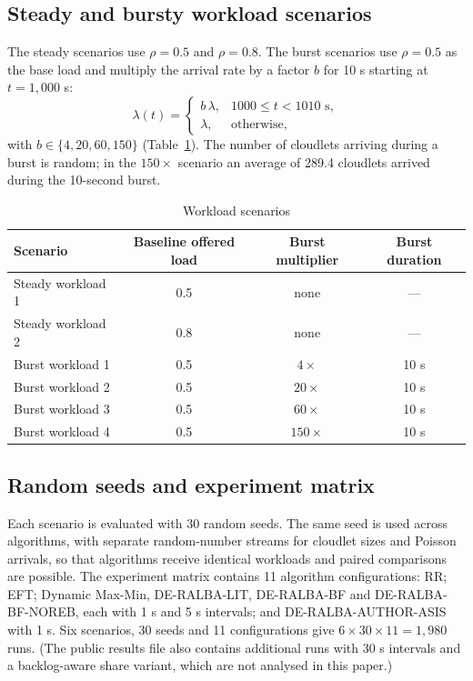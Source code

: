 \documentclass[default,sn-mathphys,Numbered]{sn-jnl}
\begin{document}
\subsection{Steady and bursty workload scenarios}
The steady scenarios use $\rho = 0.5$ and $\rho = 0.8$. The burst scenarios use $\rho = 0.5$ as the base load and multiply the arrival rate by a factor $b$ for 10 s starting at $t = 1{,}000$ s:
\begin{equation}\label{eq:burst}
\lambda(t) = \begin{cases} b\,\lambda, & 1000 \le t < 1010 \text{ s},\\ \lambda, & \text{otherwise}, \end{cases}
\end{equation}
with $b \in \{4, 20, 60, 150\}$ (Table~\ref{tab:scen}). The number of cloudlets arriving during a burst is random; in the $150\times$ scenario an average of 289.4 cloudlets arrived during the 10-second burst.

\begin{table}[h]
\caption{Workload scenarios}\label{tab:scen}
\centering
\begin{tabular}{lccc}
\toprule
Scenario & Baseline offered load & Burst multiplier & Burst duration \\
\midrule
Steady workload 1 & 0.5 & none & --- \\
Steady workload 2 & 0.8 & none & --- \\
Burst workload 1 & 0.5 & $4\times$ & 10 s \\
Burst workload 2 & 0.5 & $20\times$ & 10 s \\
Burst workload 3 & 0.5 & $60\times$ & 10 s \\
Burst workload 4 & 0.5 & $150\times$ & 10 s \\
\bottomrule
\end{tabular}
\end{table}

\subsection{Random seeds and experiment matrix}
Each scenario is evaluated with 30 random seeds. The same seed is used across algorithms, with separate random-number streams for cloudlet sizes and Poisson arrivals, so that algorithms receive identical workloads and paired comparisons are possible. The experiment matrix contains 11 algorithm configurations: RR; EFT; Dynamic Max-Min, DE-RALBA-LIT, DE-RALBA-BF and DE-RALBA-BF-NOREB, each with 1 s and 5 s intervals; and DE-RALBA-AUTHOR-ASIS with 1 s. Six scenarios, 30 seeds and 11 configurations give $6 \times 30 \times 11 = 1{,}980$ runs. (The public results file also contains additional runs with 30 s intervals and a backlog-aware share variant, which are not analysed in this paper.)
\end{document}
